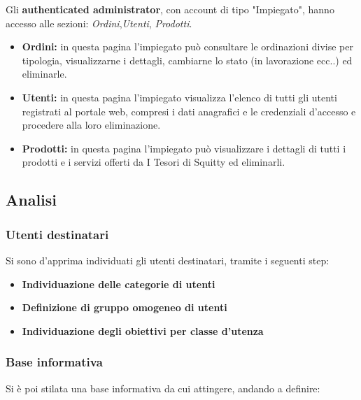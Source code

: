 Gli \textbf{authenticated administrator}, con account di tipo "Impiegato", hanno accesso alle sezioni: \textit{Ordini},\textit{Utenti}, \textit{Prodotti}.

\begin{itemize}
	\item \textbf{Ordini:} in questa pagina l'impiegato può consultare le ordinazioni divise per tipologia, visualizzarne i dettagli, cambiarne lo stato (in lavorazione ecc..) ed eliminarle.

	\item \textbf{Utenti:} in questa pagina l'impiegato visualizza l'elenco di tutti gli utenti registrati al portale web, compresi i dati anagrafici e le credenziali d'accesso e procedere alla loro eliminazione.

	\item \textbf{Prodotti:} in questa pagina l'impiegato può visualizzare i dettagli di tutti i prodotti e i servizi offerti da I Tesori di Squitty ed eliminarli.
\end{itemize}

\subsection{Analisi}

\subsubsection{Utenti destinatari}

Si sono d'apprima individuati gli utenti destinatari, tramite i seguenti step:

\begin{itemize}
	\item \textbf{Individuazione delle categorie di utenti}

	\item \textbf{Definizione di gruppo omogeneo di utenti}

	\item \textbf{Individuazione degli obiettivi per classe d'utenza}
\end{itemize}


\subsubsection{Base informativa}

Si è poi stilata una base informativa da cui attingere, andando a definire:

